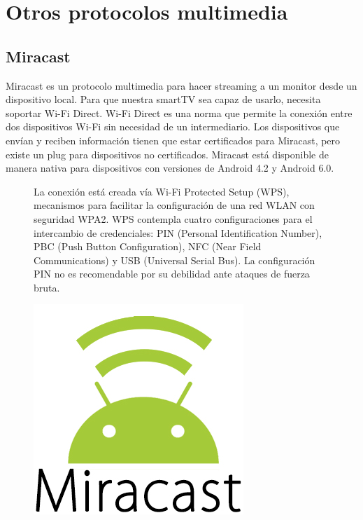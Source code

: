 \section{Otros protocolos multimedia}

\subsection{Miracast}
Miracast es un protocolo multimedia para hacer streaming a un monitor desde un dispositivo local. Para que nuestra smartTV sea capaz de usarlo, necesita soportar Wi-Fi Direct. Wi-Fi Direct es una norma que permite la conexión entre dos dispositivos Wi-Fi sin necesidad de un intermediario.
Los dispositivos que envían y reciben información tienen que estar certificados para Miracast, pero existe un plug para dispositivos no certificados.
Miracast está disponible de manera nativa para dispositivos con versiones de Android 4.2 y Android 6.0.

\vspace{0.1cm}
\begin{figure}[ht]
	\begin{minipage}[b]{0.55\linewidth}
		La conexión está creada vía Wi-Fi Protected Setup (WPS), mecanismos para facilitar la configuración de una red WLAN con seguridad WPA2.
		WPS contempla cuatro configuraciones para el intercambio de credenciales: PIN (Personal Identification Number), PBC (Push Button Configuration), NFC (Near Field Communications) y USB (Universal Serial Bus). La configuración PIN no es recomendable por su debilidad ante ataques de fuerza bruta.
	\end{minipage}%
	\begin{minipage}[b]{0.45\linewidth}
		\centering
		\includegraphics[width=.55\linewidth]{./Imagenes/miracast.jpg}
	\end{minipage}
\end{figure}

